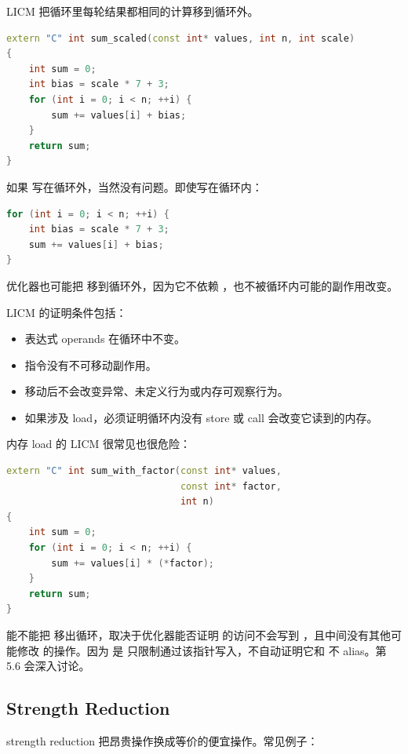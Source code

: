 LICM 把循环里每轮结果都相同的计算移到循环外。

\begin{lstlisting}[language=C++]
extern "C" int sum_scaled(const int* values, int n, int scale)
{
    int sum = 0;
    int bias = scale * 7 + 3;
    for (int i = 0; i < n; ++i) {
        sum += values[i] + bias;
    }
    return sum;
}
\end{lstlisting}

如果  写在循环外，当然没有问题。即使写在循环内：

\begin{lstlisting}[language=C++]
for (int i = 0; i < n; ++i) {
    int bias = scale * 7 + 3;
    sum += values[i] + bias;
}
\end{lstlisting}

优化器也可能把  移到循环外，因为它不依赖 ，也不被循环内可能的副作用改变。

LICM 的证明条件包括：

\begin{itemize}
  \item 表达式 operands 在循环中不变。
  \item 指令没有不可移动副作用。
  \item 移动后不会改变异常、未定义行为或内存可观察行为。
  \item 如果涉及 load，必须证明循环内没有 store 或 call 会改变它读到的内存。
\end{itemize}

内存 load 的 LICM 很常见也很危险：

\begin{lstlisting}[language=C++]
extern "C" int sum_with_factor(const int* values,
                               const int* factor,
                               int n)
{
    int sum = 0;
    for (int i = 0; i < n; ++i) {
        sum += values[i] * (*factor);
    }
    return sum;
}
\end{lstlisting}

能不能把  移出循环，取决于优化器能否证明  的访问不会写到 ，且中间没有其他可能修改  的操作。因为  是  只限制通过该指针写入，不自动证明它和  不 alias。第 5.6 会深入讨论。

\subsection{Strength Reduction}

strength reduction 把昂贵操作换成等价的便宜操作。常见例子：

